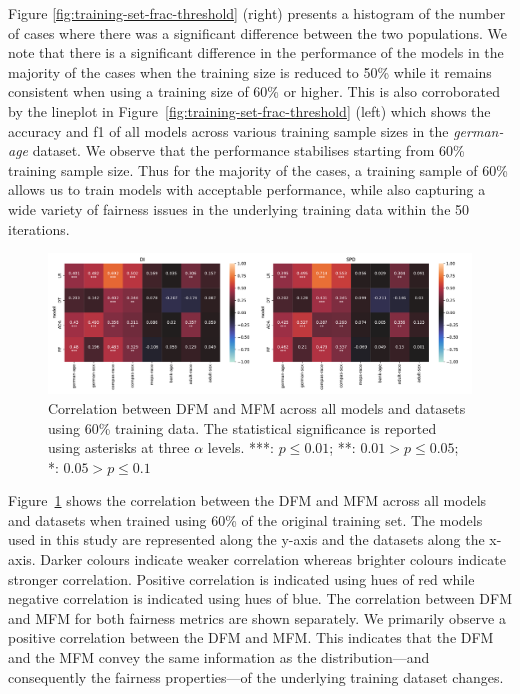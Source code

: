 \documentclass[sigconf,review,anonymous]{acmart}
\begin{document}
Figure \ref{fig:training-set-frac-threshold} (right) presents
a histogram of the number of cases where there was a significant
difference between the two populations. We note that there is
a significant difference in the performance of the models in the
majority of the cases when the training size is reduced to 50\% while
it remains consistent when using a training size of 60\% or
higher. This is also corroborated by the lineplot in
Figure \ref{fig:training-set-frac-threshold} (left) which shows the
accuracy and f1 of all models across various training sample sizes in
the \emph{german-age} dataset. We observe that the performance
stabilises starting from 60\% training sample size. Thus for the
majority of the cases, a training sample of 60\% allows us to train
models with acceptable performance, while also capturing a wide
variety of fairness issues in the underlying training data within the
50 iterations.

\begin{figure}
  \centering
  \includegraphics[width=\linewidth]{heatmap--corr--training-sets-frac.pdf}
  \caption{Correlation between DFM and MFM across all models and
  datasets using 60\% training data. The statistical significance is
  reported using asterisks at three $\alpha$ levels. ***: $p \le
  0.01$; **: $0.01 > p \le 0.05$; *: $0.05 > p \le 0.1$}
  \label{fig:heatmap--corr--training-sets-frac}
\end{figure}

Figure \ref{fig:heatmap--corr--training-sets-frac} shows the
correlation between the DFM and MFM across all models and datasets
when trained using 60\% of the original training set. The models used
in this study are represented along the y-axis and the datasets along
the x-axis. Darker colours indicate weaker correlation whereas
brighter colours indicate stronger correlation. Positive correlation
is indicated using hues of red while negative correlation is indicated
using hues of blue. The correlation between DFM and MFM for both
fairness metrics are shown separately. We primarily observe a positive
correlation between the DFM and MFM. This indicates that the DFM and
the MFM convey the same information as the distribution---and
consequently the fairness properties---of the underlying training
dataset changes.
\end{document}

